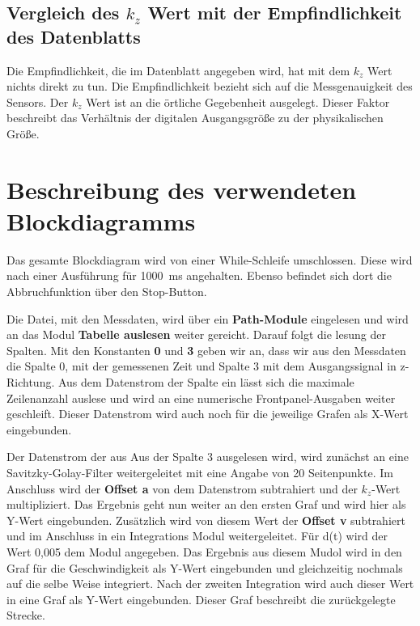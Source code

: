         \subsection{Vergleich des \(k_z\) Wert mit der Empfindlichkeit des Datenblatts}
            Die Empfindlichkeit, die im Datenblatt angegeben wird, hat mit dem \(k_z\) Wert nichts direkt zu tun. Die Empfindlichkeit bezieht sich auf die Messgenauigkeit des Sensors. 
            Der \(k_z\) Wert ist an die örtliche Gegebenheit ausgelegt. Dieser Faktor beschreibt das Verhältnis der digitalen Ausgangsgröße zu der physikalischen Größe.
    \section{Beschreibung des verwendeten Blockdiagramms} 
        Das gesamte Blockdiagram wird von einer While-Schleife umschlossen. Diese wird nach einer Ausführung für \SI{1000}{\milli\second} angehalten. 
        Ebenso befindet sich dort die Abbruchfunktion über den Stop-Button.\par
        Die Datei, mit den Messdaten, wird über ein \textbf{Path-Module} eingelesen und wird an das Modul \textbf{Tabelle auslesen} weiter gereicht. Darauf folgt die lesung der Spalten. Mit den Konstanten \textbf{0} und \textbf{3} geben wir an, dass wir aus den Messdaten die Spalte 0, mit der gemessenen Zeit und Spalte 3 mit dem Ausgangssignal in z-Richtung.
        Aus dem Datenstrom der Spalte ein lässt sich die maximale Zeilenanzahl auslese und wird an eine numerische Frontpanel-Ausgaben weiter geschleift.
        Dieser Datenstrom wird auch noch für die jeweilige Grafen als X-Wert eingebunden. \par
        Der Datenstrom der aus Aus der Spalte 3 ausgelesen wird, wird zunächst an eine Savitzky-Golay-Filter weitergeleitet mit eine Angabe von 20 Seitenpunkte.
        Im Anschluss wird der \textbf{Offset a} von dem Datenstrom subtrahiert und der \(k_z\)-Wert multipliziert. Das Ergebnis geht nun weiter an den ersten Graf und wird hier als Y-Wert eingebunden. 
        Zusätzlich wird von diesem Wert der \textbf{Offset v} subtrahiert und im Anschluss in ein Integrations Modul weitergeleitet. Für d(t) wird der Wert 0,005 dem Modul angegeben. Das Ergebnis aus diesem Mudol wird in den Graf für die Geschwindigkeit als Y-Wert eingebunden und gleichzeitig nochmals auf die selbe Weise integriert.
        Nach der zweiten Integration wird auch dieser Wert in eine Graf als Y-Wert eingebunden. Dieser Graf beschreibt die zurückgelegte Strecke.
